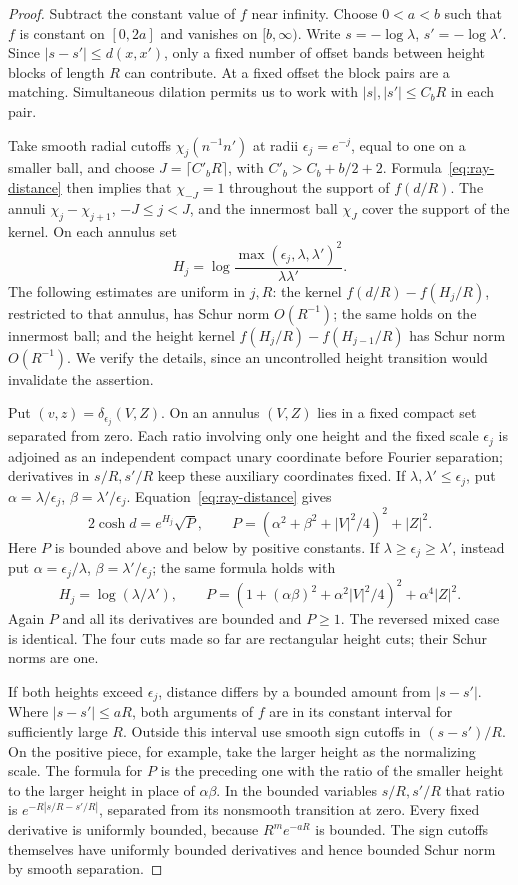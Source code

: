 \begin{proof}
Subtract the constant value of \(f\) near infinity.  Choose \(0<a<b\)
such that \(f\) is constant on \([0,2a]\) and vanishes on \([b,\infty)\).
Write \(s=-\log\lambda\), \(s'=-\log\lambda'\).  Since
\(|s-s'|\le d(x,x')\), only a fixed number of offset bands between
height blocks of length \(R\) can contribute.  At a fixed offset the
block pairs are a matching.  Simultaneous dilation permits us to work
with \(|s|,|s'|\le C_bR\) in each pair.

Take smooth radial cutoffs \(\chi_j(n^{-1}n')\) at radii
\(\epsilon_j=e^{-j}\), equal to one on a smaller ball, and choose
\(J=\lceil C'_bR\rceil\), with \(C'_b>C_b+b/2+2\).  Formula~\eqref{eq:ray-distance}
then implies that \(\chi_{-J}=1\) throughout the support of
\(f(d/R)\).  The annuli
\(\chi_j-\chi_{j+1}\), \(-J\le j<J\), and the innermost ball
\(\chi_J\) cover the support of the kernel.  On each annulus set
\[
 H_j=\log\frac{\max(\epsilon_j,\lambda,\lambda')^2}
                         {\lambda\lambda'}.
\]
The following estimates are uniform in \(j,R\): the kernel
\(f(d/R)-f(H_j/R)\), restricted to that annulus, has Schur norm
\(O(R^{-1})\); the same holds on the innermost ball; and the height
kernel \(f(H_j/R)-f(H_{j-1}/R)\) has Schur norm \(O(R^{-1})\).
We verify the details, since an uncontrolled height transition would
invalidate the assertion.

Put \((v,z)=\delta_{\epsilon_j}(V,Z)\).  On an annulus \((V,Z)\)
lies in a fixed compact set separated from zero.  Each ratio involving
only one height and the fixed scale \(\epsilon_j\) is adjoined as an
independent compact unary coordinate before Fourier separation;
derivatives in \(s/R,s'/R\) keep these auxiliary coordinates fixed.  If
\(\lambda,\lambda'\le\epsilon_j\), put
\(\alpha=\lambda/\epsilon_j\), \(\beta=\lambda'/\epsilon_j\).
Equation~\eqref{eq:ray-distance} gives
\[
 2\cosh d=e^{H_j}\sqrt P,\qquad
 P=(\alpha^2+\beta^2+|V|^2/4)^2+|Z|^2.
\]
Here \(P\) is bounded above and below by positive constants.  If
\(\lambda\ge\epsilon_j\ge\lambda'\), instead put
\(\alpha=\epsilon_j/\lambda\), \(\beta=\lambda'/\epsilon_j\);
the same formula holds with
\[
 H_j=\log(\lambda/\lambda'),\qquad
 P=(1+(\alpha\beta)^2+\alpha^2|V|^2/4)^2+\alpha^4|Z|^2.
\]
Again \(P\) and all its derivatives are bounded and \(P\ge1\).
The reversed mixed case is identical.  The four cuts made so far are
rectangular height cuts; their Schur norms are one.

If both heights exceed \(\epsilon_j\), distance differs by a bounded
amount from \(|s-s'|\).  Where \(|s-s'|\le aR\), both arguments of
\(f\) are in its constant interval for sufficiently large \(R\).
Outside this interval use smooth sign cutoffs in \((s-s')/R\).
On the positive piece, for example, take the larger height as the
normalizing scale.  The formula for \(P\) is the preceding one with
the ratio of the smaller height to the larger height in place of
\(\alpha\beta\).  In the bounded variables \(s/R,s'/R\) that ratio
is \(e^{-R|s/R-s'/R|}\), separated from its nonsmooth transition at
zero.  Every fixed derivative is uniformly bounded, because
\(R^m e^{-aR}\) is bounded.  The sign cutoffs themselves have uniformly
bounded derivatives and hence bounded Schur norm by smooth separation.


\end{proof}
